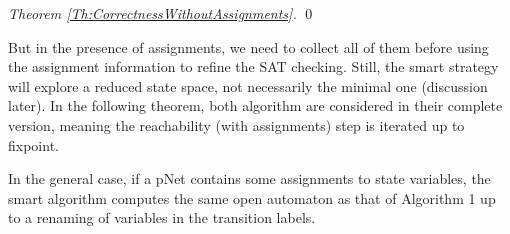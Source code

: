 \documentclass[smallcondensed]{svjour3}
\begin{document}
\begin{proof}[Theorem \ref{Th:CorrectnessWithoutAssignments}]
%		
%	
%
%
\hfill\qed
\end{proof}

But in the presence of assignments, we need to collect all of them
  before using the assignment information to refine the SAT
  checking. Still, the smart strategy will explore a reduced state
  space, not necessarily the minimal one (discussion later). In the
  following theorem, both algorithm are considered in their complete
  version, meaning the reachability (with assignments) step is
  iterated up to fixpoint.
  
\begin{theorem}
  \label{Th:CorrectnessWithAssignments}
In the general case, if a pNet contains some assignments to state variables, the smart algorithm computes 
the same open automaton as that of Algorithm 1 up to a renaming of variables in the transition labels.
\end{theorem}
\end{document}
